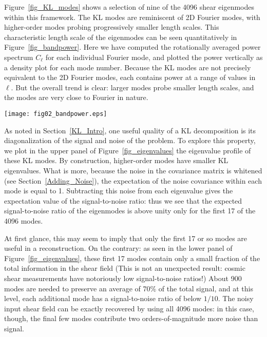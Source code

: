 Figure~\ref{fig_KL_modes} shows a selection of
nine of the 4096 shear eigenmodes within
this framework.  The KL modes are reminiscent of 2D Fourier modes, with
higher-order modes probing progressively smaller length scales.  
This characteristic length scale of the eigenmodes
can be seen quantitatively in Figure~\ref{fig_bandpower}.  
Here we have computed the rotationally averaged
power spectrum $C_\ell$ for each individual Fourier mode, and plotted the
power vertically as a density plot for each mode number.  
Because the KL modes are
not precisely equivalent to the 2D Fourier modes, each contains power at
a range of values in $\ell$.  But the overall trend is clear: larger modes
probe smaller length scales, and the modes are very close to Fourier in
nature.

\begin{figure*}
 \centering
 \texttt{[image: fig02\_bandpower.eps]}
 \caption{The normalized power spectrum of each KL mode.  For constant
   mode number, the figure represents a histogram of the power in that KL
   mode, normalized to a constant total power.  KL modes represent a 
   linear combination of Fourier modes, so that the power in each KL 
   mode is spread over a range of $\ell$ values.  Nevertheless,
   the general trend is clear: larger mode numbers are associated with
   larger wave numbers, and thus smaller length scales.
   \label{fig_bandpower} }
\end{figure*}

As noted in Section~\ref{KL_Intro}, one useful quality of a KL decomposition
is its diagonalization of the signal and noise of the problem.
To explore this property, we plot in the upper panel of 
Figure~\ref{fig_eigenvalues} the eigenvalue profile 
of these KL modes. By construction, higher-order modes 
have smaller KL eigenvalues.  What is more,
because the noise in the covariance matrix is whitened 
(see Section~\ref{Adding_Noise}), the expectation of the noise covariance
within each mode is equal to 1.  Subtracting this noise from each eigenvalue 
gives the expectation value of the signal-to-noise ratio: 
thus we see that the expected
signal-to-noise ratio of the eigenmodes is above unity only for the first
17 of the 4096 modes.

At first glance, this may seem to imply that only the first 17 or so modes
are useful in a reconstruction.  On the contrary: as seen in the lower panel
of Figure~\ref{fig_eigenvalues}, these first 17 modes contain only a
small fraction of the total information in the shear field (This is not 
an unexpected result: cosmic shear measurements have 
notoriously low signal-to-noise ratios!)
About 900 modes are needed to preserve an average of 70\% of the total signal, 
and at this level, each additional mode has a signal-to-noise ratio 
of below $1/10$.  The noisy input shear field can be exactly recovered
by using all 4096 modes: in this case, though, the final few modes 
contribute two orders-of-magnitude more noise than signal.

